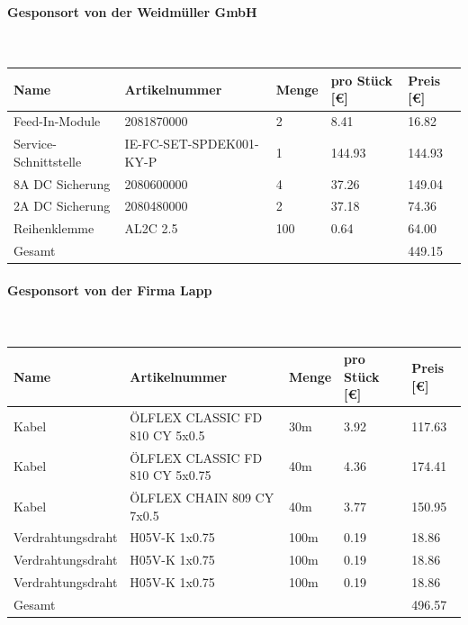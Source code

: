 \paragraph{Gesponsort von der Weidmüller GmbH}\mbox{}\\
\begin{table}[H]
    \begin{tabular}{lllll}
    Name                & Artikelnummer                          & Menge & pro Stück {[}€{]} & Preis {[}€{]} \\ \hline
    Feed-In-Module      & 2081870000                             & 2     & 8.41              & 16.82         \\
    Service-Schnittstelle & IE-FC-SET-SPDEK001-KY-P               & 1     & 144.93            & 144.93        \\
    8A DC Sicherung     & 2080600000                             & 4     & 37.26             & 149.04        \\
    2A DC Sicherung     & 2080480000                             & 2     & 37.18             & 74.36         \\
    Reihenklemme        & AL2C 2.5                               & 100   & 0.64              & 64.00         \\ \hline
    Gesamt              &                                        &       &                   & 449.15       
    \end{tabular}
\end{table}
\paragraph{Gesponsort von der Firma Lapp}\mbox{}\\
\begin{table}[H]
    \begin{tabular}{lllll}
    Name                & Artikelnummer                          & Menge & pro Stück {[}€{]} & Preis {[}€{]} \\ \hline
    Kabel               & ÖLFLEX CLASSIC FD 810 CY 5x0.5         & 30m   & 3.92              & 117.63        \\
    Kabel               & ÖLFLEX CLASSIC FD 810 CY 5x0.75        & 40m   & 4.36              & 174.41        \\
    Kabel               & ÖLFLEX CHAIN 809 CY 7x0.5              & 40m   & 3.77              & 150.95        \\
    Verdrahtungsdraht   & H05V-K 1x0.75                          & 100m  & 0.19              & 18.86         \\
    Verdrahtungsdraht   & H05V-K 1x0.75                          & 100m  & 0.19              & 18.86         \\
    Verdrahtungsdraht   & H05V-K 1x0.75                          & 100m  & 0.19              & 18.86         \\ \hline
    Gesamt              &                                        &       &                   & 496.57       
    \end{tabular}
\end{table}
